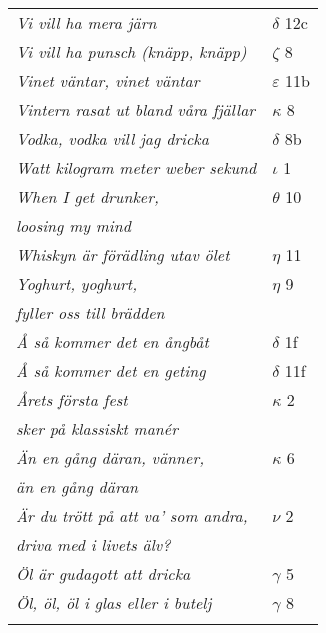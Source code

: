 \documentclass[a6paper,10pt]{article}
\begin{document}
\newpage
\begin{table}[!]
\begin{tabular}{l l}
\textit{Vi vill ha mera järn}	&$\delta$ 12c\\
\textit{Vi vill ha punsch (knäpp, knäpp)}	&$\zeta$ 8\\
\textit{Vinet väntar, vinet väntar}	&$\varepsilon$ 11b\\
\textit{Vintern rasat ut bland våra fjällar}	&$\kappa$ 8\\
\textit{Vodka, vodka vill jag dricka}	&$\delta$ 8b\\
\textit{Watt kilogram meter weber sekund}	&$\iota$ 1\\
\textit{When I get drunker,}	&$\theta$ 10\\
\textit{loosing my mind} &\\
\textit{Whiskyn är förädling utav ölet}	&$\eta$ 11\\
\textit{Yoghurt, yoghurt,}	&$\eta$ 9\\
\textit{fyller oss till brädden} &\\
\textit{Å så kommer det en ångbåt}	&$\delta$ 1f\\
\textit{Å så kommer det en geting}	&$\delta$ 11f\\
\textit{Årets första fest}	&$\kappa$ 2\\
\textit{sker på klassiskt manér} &\\
\textit{Än en gång däran, vänner,}	&$\kappa$ 6\\
\textit{än en gång däran} &\\
\textit{Är du trött på att va' som andra,}	&$\nu$ 2\\
\textit{driva med i livets älv?} &\\
\textit{Öl är gudagott att dricka}	&$\gamma$ 5\\
\textit{Öl, öl, öl i glas eller i butelj}	&$\gamma$ 8\\ 
\vspace{150pt}
\end{tabular}
\end{table}
\end{document}
